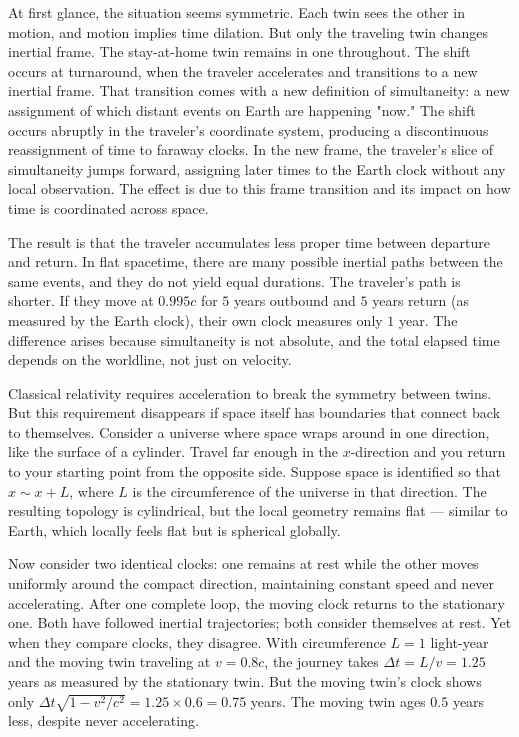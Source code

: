 At first glance, the situation seems symmetric. Each twin sees the other in motion, and motion implies time dilation. But only the traveling twin changes inertial frame. The stay-at-home twin remains in one throughout. The shift occurs at turnaround, when the traveler accelerates and transitions to a new inertial frame. That transition comes with a new definition of simultaneity: a new assignment of which distant events on Earth are happening "now." The shift occurs abruptly in the traveler's coordinate system, producing a discontinuous reassignment of time to faraway clocks. In the new frame, the traveler's slice of simultaneity jumps forward, assigning later times to the Earth clock without any local observation. The effect is due to this frame transition and its impact on how time is coordinated across space.

The result is that the traveler accumulates less proper time between departure and return. In flat spacetime, there are many possible inertial paths between the same events, and they do not yield equal durations. The traveler's path is shorter. If they move at $0.995c$ for $5$ years outbound and $5$ years return (as measured by the Earth clock), their own clock measures only $1$ year. The difference arises because simultaneity is not absolute, and the total elapsed time depends on the worldline, not just on velocity.

Classical relativity requires acceleration to break the symmetry between twins. But this requirement disappears if space itself has boundaries that connect back to themselves. Consider a universe where space wraps around in one direction, like the surface of a cylinder. Travel far enough in the $x$-direction and you return to your starting point from the opposite side. Suppose space is identified so that $x \sim x + L$, where $L$ is the circumference of the universe in that direction. The resulting topology is cylindrical, but the local geometry remains flat — similar to Earth, which locally feels flat but is spherical globally.

Now consider two identical clocks: one remains at rest while the other moves uniformly around the compact direction, maintaining constant speed and never accelerating. After one complete loop, the moving clock returns to the stationary one. Both have followed inertial trajectories; both consider themselves at rest. Yet when they compare clocks, they disagree. With circumference $L = 1$ light-year and the moving twin traveling at $v = 0.8c$, the journey takes $\Delta t = L/v = 1.25$ years as measured by the stationary twin. But the moving twin's clock shows only $\Delta t \sqrt{1 - v^2/c^2} = 1.25 \times 0.6 = 0.75$ years. The moving twin ages $0.5$ years less, despite never accelerating.

